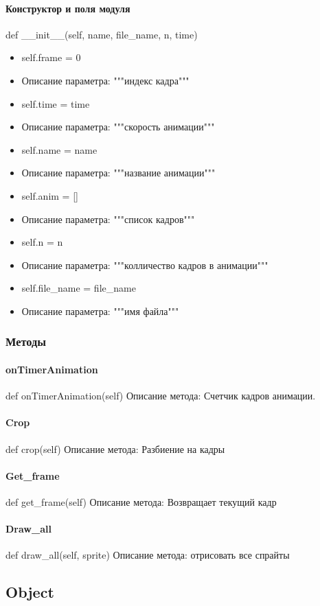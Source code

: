 \paragraph{Конструктор и поля модуля}
def \_\_init\_\_(self, name, file\_name, n, time)
\begin{itemize}
	\item self.frame = 0
	\item Описание параметра: """индекс кадра"""
	\item self.time = time
	\item Описание параметра: """скорость анимации"""
	\item self.name = name
	\item Описание параметра: """название анимации"""
	\item self.anim = []
	\item Описание параметра: """список кадров"""
	\item self.n = n
	\item Описание параметра: """колличество кадров в анимации"""
	\item self.file\_name = file\_name
	\item Описание параметра: """имя файла"""
\end{itemize}
\subsubsection{Методы}
\paragraph{onTimerAnimation}
def onTimerAnimation(self)
Описание метода: Счетчик кадров анимации.
\paragraph{Crop}
def crop(self)
Описание метода: Разбиение на кадры
\paragraph{Get\_frame}
def get\_frame(self)
Описание метода: Возвращает текущий кадр
\paragraph{Draw\_all}
def draw\_all(self, sprite)
Описание метода: отрисовать все спрайты

\subsection{Object}
